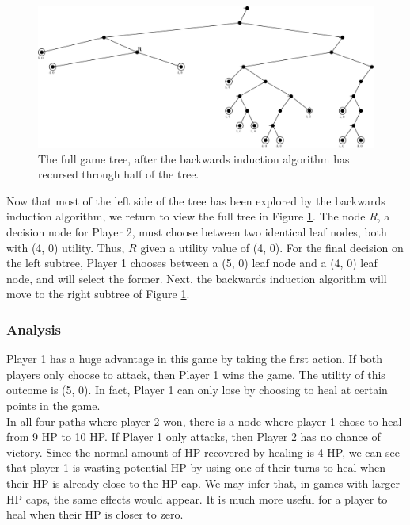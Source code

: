 \begin{figure}[H]
  \centering
  \includegraphics[width=15cm]{figures/Backwards5.png}
  \caption{The full game tree, after the backwards induction algorithm has recursed through half of the tree.}
  \label{fig:backwards5}
\end{figure}
  
Now that most of the left side of the tree has been explored by the backwards induction algorithm, we return to view the full tree in Figure \ref{fig:backwards5}. The node $R$, a decision node for Player 2, must choose between two identical leaf nodes, both with (4, 0) utility. Thus, $R$ given a utility value of (4, 0). For the final decision on the left subtree, Player 1 chooses between a (5, 0) leaf node and a (4, 0) leaf node, and will select the former. Next, the backwards induction algorithm will move to the right subtree of Figure \ref{fig:backwards5}.


\subsubsection{Analysis}
Player 1 has a huge advantage in this game by taking the first action. If both players only choose to attack, then Player 1 wins the game. The utility of this outcome is (5, 0). In fact, Player 1 can only lose by choosing to heal at certain points in the game.\\

In all four paths where player 2 won, there is a node where player 1 chose to heal from 9 HP to 10 HP. If Player 1 only attacks, then Player 2 has no chance of victory. Since the normal amount of HP recovered by healing is 4 HP, we can see that player 1 is wasting potential HP by using one of their turns to heal when their HP is already close to the HP cap. We may infer that, in games with larger HP caps, the same effects would appear. It is much more useful for a player to heal when their HP is closer to zero.\\

